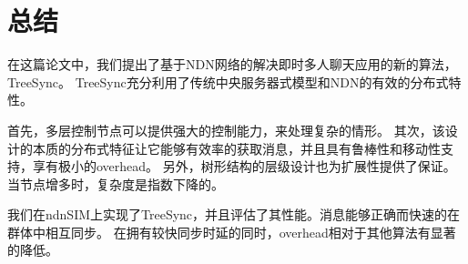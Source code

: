 \chapter{总结}

在这篇论文中，我们提出了基于NDN网络的解决即时多人聊天应用的新的算法，TreeSync。
TreeSync充分利用了传统中央服务器式模型和NDN的有效的分布式特性。

首先，多层控制节点可以提供强大的控制能力，来处理复杂的情形。
其次，该设计的本质的分布式特征让它能够有效率的获取消息，并且具有鲁棒性和移动性支持，享有极小的overhead。
另外，树形结构的层级设计也为扩展性提供了保证。当节点增多时，复杂度是指数下降的。

我们在ndnSIM上实现了TreeSync，并且评估了其性能。消息能够正确而快速的在群体中相互同步。
在拥有较快同步时延的同时，overhead相对于其他算法有显著的降低。

